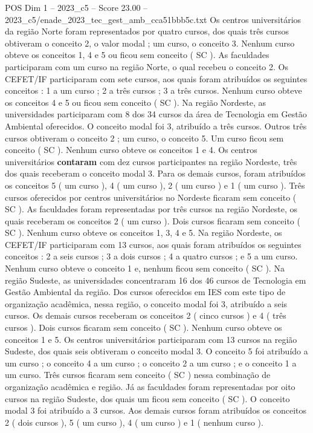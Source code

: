 \begin{textsample}{POS Dim 1 – 2023\_c5 – Score 23.00 – 2023\_c5/enade\_2023\_tec\_gest\_amb\_cca51bbb5c.txt}
Os centros universitários da região Norte foram representados por quatro cursos, dos quais três cursos obtiveram o conceito 2, o valor modal ; um curso, o conceito 3.
Nenhum curso obteve os conceitos 1, 4 e 5 ou ficou sem conceito ( SC ).
As faculdades participaram com um curso na região Norte, o qual recebeu o conceito 2.
Os CEFET/IF participaram com sete cursos, aos quais foram atribuídos os seguintes conceitos : 1 a um curso ; 2 a três cursos ; 3 a três cursos.
Nenhum curso obteve os conceitos 4 e 5 ou ficou sem conceito ( SC ).
Na região Nordeste, as universidades participaram com 8 dos 34 cursos da área de Tecnologia em Gestão Ambiental oferecidos.
O conceito modal foi 3, atribuído a três cursos.
Outros três cursos obtiveram o conceito 2 ; um curso, o conceito 5.
Um curso ficou sem conceito ( SC ).
Nenhum curso obteve os conceitos 1 e 4.
Os centros universitários \textbf{contaram} com dez cursos participantes na região Nordeste, três dos quais receberam o conceito modal 3.
Para os demais cursos, foram atribuídos os conceitos 5 ( um curso ), 4 ( um curso ), 2 ( um curso ) e 1 ( um curso ).
Três cursos oferecidos por centros universitários no Nordeste ficaram sem conceito ( SC ).
As faculdades foram representadas por três cursos na região Nordeste, os quais receberam os conceitos 2 ( um curso ).
Dois cursos ficaram sem conceito ( SC ).
Nenhum curso obteve os conceitos 1, 3, 4 e 5.
Na região Nordeste, os CEFET/IF participaram com 13 cursos, aos quais foram atribuídos os seguintes conceitos : 2 a seis cursos ; 3 a dois cursos ; 4 a quatro cursos ; e 5 a um curso.
Nenhum curso obteve o conceito 1 e, nenhum ficou sem conceito ( SC ).
Na região Sudeste, as universidades concentraram 16 dos 46 cursos de Tecnologia em Gestão Ambiental da região.
Dos cursos oferecidos em IES com este tipo de organização acadêmica, nessa região, o conceito modal foi 3, atribuído a seis cursos.
Os demais cursos receberam os conceitos 2 ( cinco cursos ) e 4 ( três cursos ).
Dois cursos ficaram sem conceito ( SC ).
Nenhum curso obteve os conceitos 1 e 5.
Os centros universitários participaram com 13 cursos na região Sudeste, dos quais seis obtiveram o conceito modal 3.
O conceito 5 foi atribuído a um curso ; o conceito 4 a um curso ; o conceito 2 a um curso ; e o conceito 1 a um curso.
Três cursos ficaram sem conceito ( SC ) nessa combinação de organização acadêmica e região.
Já as faculdades foram representadas por oito cursos na região Sudeste, dos quais um ficou sem conceito ( SC ).
O conceito modal 3 foi atribuído a 3 cursos.
Aos demais cursos foram atribuídos os conceitos 2 ( dois cursos ), 5 ( um curso ), 4 ( um curso ) e 1 ( nenhum curso ).

\end{textsample}
